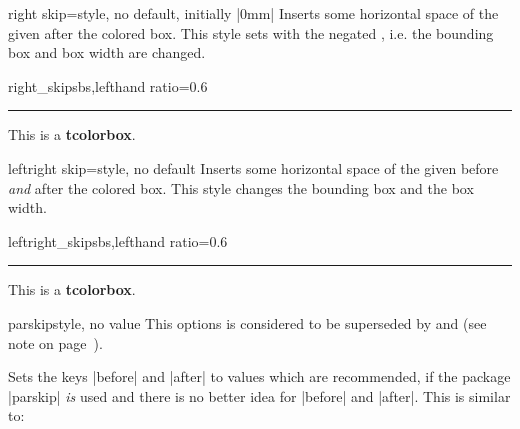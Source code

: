\begin{docTcbKey}[][doc new=2014-11-07]{right skip}{=}{style, no default, initially |0mm|}
  Inserts some horizontal space of the given  after the colored box.
  This style sets  with the negated ,
  i.e. the bounding box and box width are changed.
\begin{exdispExample*}{right_skip}{sbs,lefthand ratio=0.6}
\noindent\rule{\linewidth}{2pt}

\begin{tcolorbox}[right skip=1cm,
    colframe=red!50!white]
  This is a \textbf{tcolorbox}.
\end{tcolorbox}
\end{exdispExample*}
\end{docTcbKey}

\begin{docTcbKey}[][doc new=2014-10-10]{leftright skip}{=}{style, no default}
  Inserts some horizontal space of the given  before \emph{and} after the colored box.
  This style changes the bounding box and the box width.
\begin{exdispExample*}{leftright_skip}{sbs,lefthand ratio=0.6}
\noindent\rule{\linewidth}{2pt}

\begin{tcolorbox}[leftright skip=1cm,
    colframe=red!50!white]
  This is a \textbf{tcolorbox}.
\end{tcolorbox}
\end{exdispExample*}
\end{docTcbKey}


\clearpage

\begin{docTcbKey}[][doc updated=2017-02-01]{parskip}{}{style, no value}
  This options is considered to be superseded by
   and 
  (see note on page~\pageref{subsec:surroundings}).\par
  Sets the keys |before| and |after| to values which are
  recommended, if the package |parskip| \emph{is} used and there is no better
  idea for |before| and |after|. This is similar to:
\begin{dispListing}
\end{dispListing}
\end{docTcbKey}

